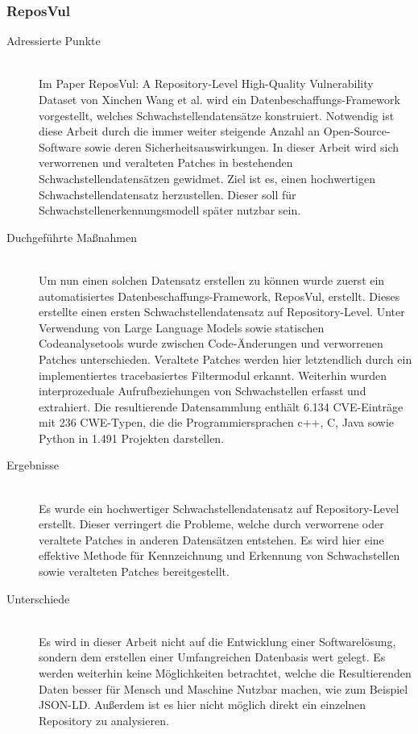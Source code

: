 \subsubsection{ReposVul} \label{sec:ReposVul}
    \begin{description}
        \item[Adressierte Punkte]\hfill \\
            Im Paper \glqq ReposVul: A Repository-Level High-Quality Vulnerability Dataset\grqq\cite{article:wang2024reposvul} von Xinchen Wang et al. wird ein Datenbeschaffungs-Framework vorgestellt, welches Schwachstellendatensätze konstruiert.
            Notwendig ist diese Arbeit durch die immer weiter steigende Anzahl an Open-Source-Software sowie deren Sicherheitsauswirkungen.
            In dieser Arbeit wird sich verworrenen und veralteten Patches in bestehenden Schwachstellendatensätzen gewidmet.
            Ziel ist es, einen hochwertigen Schwachstellendatensatz herzustellen.
            Dieser soll für Schwachstellenerkennungsmodell später nutzbar sein.
        \item[Duchgeführte Maßnahmen]\hfill \\
            Um nun einen solchen Datensatz erstellen zu können wurde zuerst ein automatisiertes Daten\-be\-schaffungs-Framework, \glqq ReposVul\grqq, erstellt.
            Dieses erstellte einen ersten Schwachstellendatensatz auf Repository-Level.
            Unter Verwendung von Large Language Models sowie statischen Codeanalysetools wurde zwischen Code-Änderungen und verworrenen Patches unterschieden.
            Veraltete Patches werden hier letztendlich durch ein implementiertes tracebasiertes Filtermodul erkannt.
            Weiterhin wurden interprozeduale Aufrufbeziehungen von Schwachstellen erfasst und extrahiert.
            Die resultierende Datensammlung enthält 6.134 CVE-Einträge mit 236 CWE-Typen, die die Programmiersprachen c++, C, Java sowie Python in 1.491 Projekten darstellen.
        \item[Ergebnisse]\hfill \\
            Es wurde ein hochwertiger Schwachstellendatensatz auf Repository-Level erstellt.
            Dieser verringert die Probleme, welche durch verworrene oder veraltete Patches in anderen Datensätzen entstehen.
            Es wird hier eine effektive Methode für Kennzeichnung und Erkennung von Schwachstellen sowie veralteten Patches bereitgestellt.
        \item[Unterschiede]\hfill \\
            Es wird in dieser Arbeit nicht auf die Entwicklung einer Softwarelösung, sondern dem erstellen einer Umfangreichen Datenbasis wert gelegt.
            Es werden weiterhin keine Möglichkeiten betrachtet, welche die Resultierenden Daten besser für Mensch und Maschine Nutzbar machen, wie zum Beispiel \ac{JSON-LD}.
            Außerdem ist es hier nicht möglich direkt ein einzelnen Repository zu analysieren.
    \end{description}